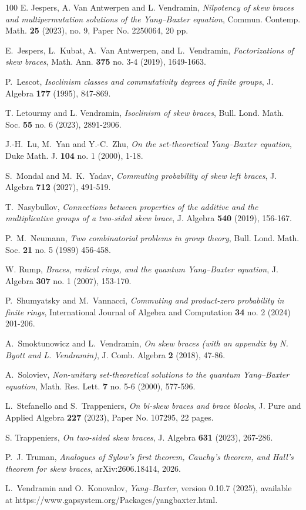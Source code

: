 \documentclass[11pt, oneside]{amsart}
\numberwithin{equation}{section}
\theoremstyle{plain}
\theoremstyle{definition}
\begin{document}
\begin{thebibliography}{100}
E. Jespers,  A.  Van Antwerpen and L.  Vendramin,  \emph{Nilpotency of skew braces and multipermutation solutions of the Yang--Baxter equation}, Commun. Contemp. Math. {\bf 25} (2023), no. 9, Paper No. 2250064, 20 pp.

E.~Jespers, L.~Kubat,  A.~Van Antwerpen, and
L.~Vendramin, \emph{Factorizations of skew braces}, Math. Ann. {\bf 375}  no. 3-4 (2019), 1649-1663.

P.~Lescot, \emph{Isoclinism classes and commutativity degrees of finite groups}, J. Algebra {\bf 177} (1995), 847-869.

T. Letourmy and L. Vendramin, \emph{Isoclinism of skew braces}, Bull. Lond. Math. Soc. {\bf 55} no. 6 (2023), 2891-2906.

J.-H.~Lu, M.~Yan and Y.-C.~Zhu, \emph{On the set-theoretical Yang--Baxter equation},  Duke Math. J. {\bf 104} no. 1 (2000), 1-18.

S.~Mondal and M.~K.~Yadav, \emph{Commuting probability of skew left braces}, J. Algebra {\bf 712} (2027), 491-519.

T.~Nasybullov, \emph{Connections between properties of the additive and the
multiplicative groups of a two-sided skew brace}, J. Algebra {\bf 540}
(2019), 156-167.

P.~M.~Neumann, \emph{Two combinatorial problems in group theory}, Bull. Lond. Math. Soc. {\bf 21} no. 5 (1989) 456-458. 

W. Rump, \emph{Braces, radical rings, and the quantum Yang--Baxter equation},  J. Algebra {\bf 307} no. 1 (2007), 153-170.

P.~Shumyatsky and M.~Vannacci, \emph{Commuting and product-zero probability in finite rings}, International Journal of Algebra and Computation {\bf 34} no. 2
(2024) 201-206.

A.~Smoktunowicz and L.~Vendramin, \emph{On skew braces (with an appendix by N. Byott and L. Vendramin)}, J. Comb. Algebra {\bf 2} (2018), 47-86.

A.~Soloviev,  \emph{Non-unitary set-theoretical solutions to the quantum Yang--Baxter equation}, Math. Res. Lett. {\bf 7} no. 5-6 (2000), 577-596.

L.~Stefanello and S.~Trappeniers, \emph{On bi-skew braces and brace blocks}, J. Pure and Applied Algebra  {\bf 227} (2023), Paper No. 107295, 22 pages. 

S. Trappeniers, \emph{On two-sided skew braces}, J. Algebra {\bf 631} (2023), 267-286. 

P.~J. Truman, \emph{Analogues of Sylow's first theorem, Cauchy's theorem,
and Hall's theorem for skew braces}, arXiv:2606.18414, 2026.

L.~Vendramin and  O.~Konovalov, {\it Yang--Baxter}, version 0.10.7  (2025), available at https://www.gapsystem.org/Packages/yangbaxter.html.

\end{thebibliography}
\end{document}
